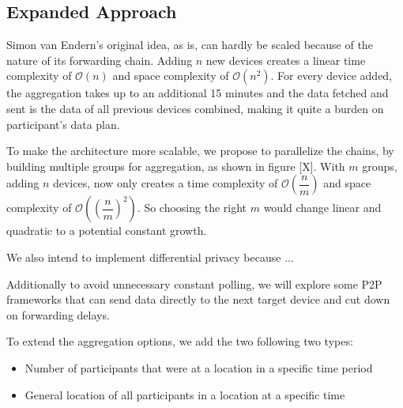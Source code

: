 \subsection{Expanded Approach}
Simon van Endern's original idea, as is, can hardly be scaled because of the nature of its forwarding chain. Adding \(n\) new devices creates a linear time complexity of \(\mathcal{O}(n)\) and space complexity of \(\mathcal{O}(n^2)\). For every device added, the aggregation takes up to an additional 15 minutes and the data fetched and sent is the data of all previous devices combined, making it quite a burden on participant's data plan. 

To make the architecture more scalable, we propose to parallelize the chains, by building multiple groups for aggregation, as shown in figure [X]. With \(m\) groups, adding \(n\) devices, now only creates a time complexity of \(\mathcal{O}(\dfrac{n}{m})\) and space complexity of \(\mathcal{O}((\dfrac{n}{m})^2)\). So choosing the right \(m\) would change linear and quadratic to a potential constant growth. 

We also intend to implement differential privacy because ...

Additionally to avoid unnecessary constant polling, we will explore some P2P frameworks that can send data directly to the next target device and cut down on forwarding delays.

To extend the aggregation options, we add the two following two types:
\begin{itemize}
	\item Number of participants that were at a location in a specific time period
	\item General location of all participants in a location at a specific time
\end{itemize}

